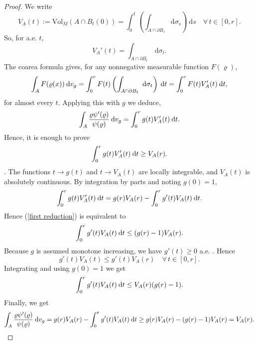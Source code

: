 \documentclass[a4paper,11pt,reqno]{amsart}
\renewcommand\eqref[1]{(\ref{#1})}
\theoremstyle{plain}
\numberwithin{equation}{section} \allowdisplaybreaks
\newcommand{\dvg}{\: {\rm d}v_{g}}
\newcommand{\dt}{\:{\rm d}t}
\begin{document}
\begin{proof}
    We write 
    \begin{equation*}
        V_A(t):=\text{Vol}_{M}(A\cap B_t(0))= \int_0^t\left(\int_{A \cap \partial B_s}\mathrm{d}\sigma_s\right)\ \mathrm{d}s\quad \forall\, t\in [0,r].
    \end{equation*}
So, for a.e. $t$, $$V_A'(t)=\int_{A \cap \partial B_t} \ \mathrm{d}\sigma _t.$$
The coarea formula gives, for any nonnegative measurable function $F(\varrho)$,
\begin{equation*}
    \int_A F(\varrho(x))\dvg= \int_0^r F(t)\left(\int_{A \cap \partial B_t} \ \mathrm{d}\sigma _t\right)\dt=\int_0^r F(t)V_A'(t)\dt,
\end{equation*}
for almost every $t$. Applying this with $g$ we deduce,
\begin{equation*}
    \int_A \frac{\varrho \psi'(\varrho)}{\psi(\varrho)}\dvg=\int_0^r g(t)V_A'(t)\dt.
\end{equation*}
Hence, it is enough to prove 
\begin{equation}\label{first reduction}
    \int_0^r g(t)V_A'(t)\dt \geq V_A(r).
\end{equation}. 
The functions $t \to g(t)$ and $t \to V_A(t)$ are locally integrable, and $V_A(t)$ is absolutely continuous. By integration by parts and noting $g(0)=1$,
\begin{equation*}
    \int_0^r g(t)V_A'(t)\dt =g(r)V_A(r)-\int_0^rg'(t)V_A(t)\dt.
\end{equation*}
Hence \eqref{first reduction} is equivalent to
\begin{equation}\label{second reduction}
    \int_0^r g'(t)V_A(t)\dt \leq (g(r)-1)V_A(r).
\end{equation}
Because $g$ is assumed monotone increasing, we have $g'(t) \geq 0$ a.e. . Hence
\begin{equation*}
    g'(t)V_A(t) \leq g'(t)V_A(r)\quad \forall \, t\in [0,r].
\end{equation*}
Integrating and using $g(0)=1$ we get
\begin{equation*}
    \int_0^r g'(t)V_A(t)\dt \leq V_A(r)(g(r)-1).
\end{equation*}
Finally, we get
\begin{equation*}
    \int_A \frac{\varrho \psi'(\varrho)}{\psi(\varrho)}\dvg=g(r)V_A(r)-\int_0^r g'(t)V_A(t)\dt\geq g(r)V_A(r)-(g(r)-1)V_A(r)=V_A(r).
\end{equation*}
\end{proof}
\end{document}
